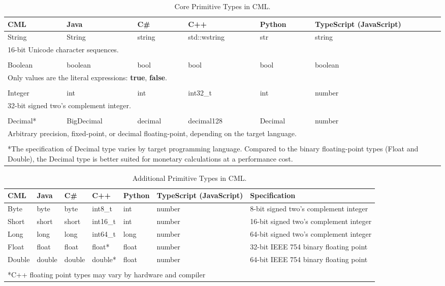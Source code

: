 \begin{table}[h]
\centering
\begin{tabular}
{l l l l l p{2cm} }
\hline
CML & Java & C\# & C++ & Python & TypeScript (JavaScript) \\
\hline
String & String & string & std::wstring & str & string \\
\multicolumn{6}{p{13cm}}{\footnotesize{16-bit Unicode character sequences.}} \\
\\
Boolean & boolean & bool & bool & bool & boolean \\
\multicolumn{6}{p{13cm}}{\footnotesize{Only values are the literal expressions: \textbf{true}, \textbf{false}.}}  \\
\\
Integer & int & int & int32\_t & int & number  \\
\multicolumn{6}{p{13cm}}{\footnotesize{32-bit signed two's complement integer.}}  \\
\\
Decimal* & BigDecimal & decimal & decimal128 & Decimal & number \\
\multicolumn{6}{p{13cm}}{\footnotesize{Arbitrary precision,
fixed-point,
or decimal floating-point, 
depending on the target language.}} \\
\\
\multicolumn{6}{p{13cm}}{*The specification of Decimal type varies by target programming language.
Compared to the binary floating-point types (Float and Double),
the Decimal type is better suited for monetary calculations
at a performance cost.}
\end{tabular}
\caption{Core Primitive Types in CML.}
\label{tab:core-primitive-types}
\end{table}

\begin{table}[h]
\centering
\begin{tabular}
{l l l l l p{2cm} p{3.5cm} }
\hline
CML & Java & C\# & C++ & Python & TypeScript (JavaScript) & Specification \\
\hline
Byte & byte & byte & int8\_t & int & number & 8-bit signed two's complement integer \\
Short & short & short & int16\_t & int & number & 16-bit signed two's complement integer \\
Long & long & long & int64\_t & long & number & 64-bit signed two's complement integer \\
Float & float & float & float* & float & number & 32-bit IEEE 754 binary floating point \\
Double & double & double & double* & float & number & 64-bit IEEE 754 binary floating point \\
\\
\multicolumn{7}{p{12cm}}{*C++ floating point types may vary by hardware and compiler}
\end{tabular}
\caption{Additional Primitive Types in CML.}
\label{tab:additional-primitive-types}
\end{table}

